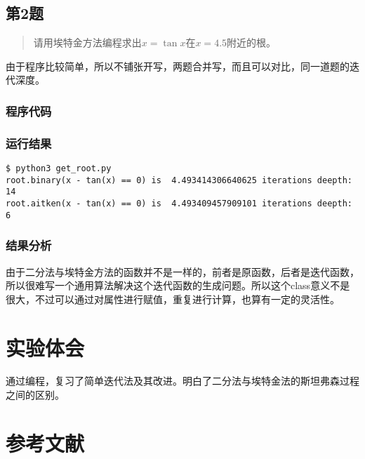 \subsection{第2题}
\begin{quote}
    {\kaishu
        请用埃特金方法编程求出$x=\tan⁡x$在$x=4.5$附近的根。
    }
\end{quote}

由于程序比较简单，所以不铺张开写，两题合并写，而且可以对比，同一道题的迭代深度。
\subsubsection{程序代码}



\subsubsection{运行结果}

\begin{lstlisting}[style = bash]
$ python3 get_root.py 
root.binary(x - tan(x) == 0) is  4.493414306640625 iterations deepth: 14
root.aitken(x - tan(x) == 0) is  4.493409457909101 iterations deepth: 6
\end{lstlisting}

\subsubsection{结果分析}

由于二分法与埃特金方法的函数并不是一样的，前者是原函数，后者是迭代函数，所以很难写一个通用算法解决这个迭代函数的生成问题。所以这个class意义不是很大，不过可以通过对属性进行赋值，重复进行计算，也算有一定的灵活性。

\section{实验体会}

通过编程，复习了简单迭代法及其改进。明白了二分法与埃特金法的斯坦弗森过程之间的区别。

\section{参考文献}

\printbibliography[heading=none]


